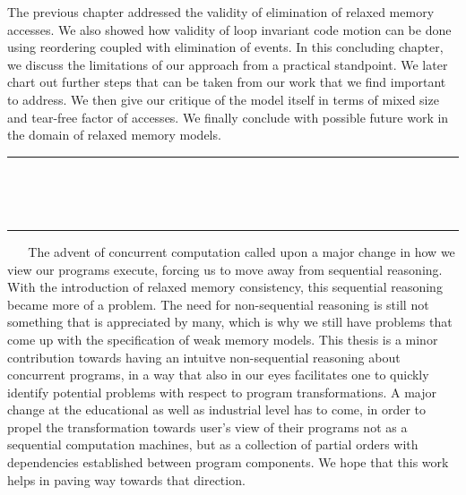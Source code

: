 The previous chapter addressed the validity of elimination of relaxed memory accesses. 
We also showed how validity of loop invariant code motion can be done using reordering coupled with elimination of events. 
In this concluding chapter, we discuss the limitations of our approach from a practical standpoint.
We later chart out further steps that can be taken from our work that we find important to address.
We then give our critique of the model itself in terms of mixed size and tear-free factor of accesses. 
We finally conclude with possible future work in the domain of relaxed memory models.
\ \newline
\ \newline  
\hrule 
\ \newline 
\ \newline 







%



\ \newline
\ \newline  
\hrule 
\ \newline 
\ \newline 
The advent of concurrent computation called upon a major change in how we view our programs execute, forcing us to move away from sequential reasoning.
With the introduction of relaxed memory consistency, this sequential reasoning became more of a problem.
The need for non-sequential reasoning is still not something that is appreciated by many, which is why we still have problems that come up with the specification of weak memory models.
This thesis is a minor contribution towards having an intuitve non-sequential reasoning about concurrent programs, in a way that also in our eyes facilitates one to quickly identify potential problems with respect to program transformations. 
A major change at the educational as well as industrial level has to come, in order to propel the transformation towards user's view of their programs not as a sequential computation machines, but as a collection of partial orders with dependencies established between program components.
We hope that this work helps in paving way towards that direction.
